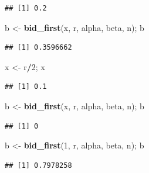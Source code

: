 \documentclass[]{book}
\newenvironment{Shaded}{\begin{snugshade}}{\end{snugshade}}
\newcommand{\KeywordTok}[1]{\textcolor[rgb]{0.13,0.29,0.53}{\textbf{#1}}}
\newcommand{\DecValTok}[1]{\textcolor[rgb]{0.00,0.00,0.81}{#1}}
\newcommand{\StringTok}[1]{\textcolor[rgb]{0.31,0.60,0.02}{#1}}
\newcommand{\OperatorTok}[1]{\textcolor[rgb]{0.81,0.36,0.00}{\textbf{#1}}}
\newcommand{\NormalTok}[1]{#1}
\begin{document}
\begin{Shaded}
\end{Shaded}

\begin{verbatim}
## [1] 0.2
\end{verbatim}

\begin{Shaded}
\begin{Highlighting}[]
\NormalTok{b <-}\StringTok{ }\KeywordTok{bid_first}\NormalTok{(x, r, alpha, beta, n); b}
\end{Highlighting}
\end{Shaded}

\begin{verbatim}
## [1] 0.3596662
\end{verbatim}

\begin{Shaded}
\begin{Highlighting}[]
\NormalTok{x <-}\StringTok{ }\NormalTok{r}\OperatorTok{/}\DecValTok{2}\NormalTok{; x}
\end{Highlighting}
\end{Shaded}

\begin{verbatim}
## [1] 0.1
\end{verbatim}

\begin{Shaded}
\begin{Highlighting}[]
\NormalTok{b <-}\StringTok{ }\KeywordTok{bid_first}\NormalTok{(x, r, alpha, beta, n); b}
\end{Highlighting}
\end{Shaded}

\begin{verbatim}
## [1] 0
\end{verbatim}

\begin{Shaded}
\begin{Highlighting}[]
\NormalTok{b <-}\StringTok{ }\KeywordTok{bid_first}\NormalTok{(}\DecValTok{1}\NormalTok{, r, alpha, beta, n); b}
\end{Highlighting}
\end{Shaded}

\begin{verbatim}
## [1] 0.7978258
\end{verbatim}
\end{document}
